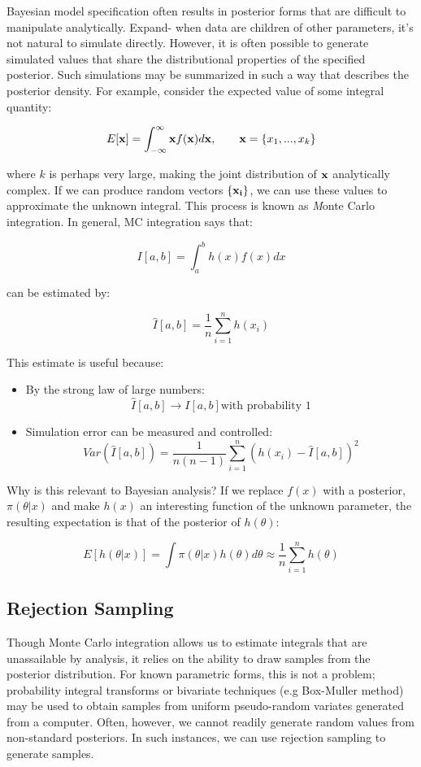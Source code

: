\documentclass[]{book}
\begin{document}
Bayesian model specification often results in posterior forms that are difficult to manipulate analytically. Expand- when data are children of other parameters, it's not natural to simulate directly. However, it is often possible to generate simulated values that share the distributional properties of the specified posterior. Such simulations may be summarized in such a way that describes the posterior density. For example, consider the expected value of some integral quantity:

\[
E[{\bf x}] = \int_{-\infty}^{\infty} {\bf x} f({\bf x}) d{\bf x}, \qquad
{\bf x} = \{x_1,...,x_k\}
\]

\noindent where $k$ is perhaps very large, making the joint distribution of ${\bf x}$ analytically complex. If we can produce random vectors $\{{\bf x_i}\}$, we can use these values to approximate the unknown integral. This process is known as {\emph Monte Carlo integration}. In general, MC integration says that:

\[
I[a,b] = \int_a^b h(x) f(x) dx
\]

\noindent can be estimated by:

\[
\hat{I}[a,b] = \frac{1}{n}\sum_{i=1}^n h(x_i)
\]

\noindent This estimate is useful because:

\begin{itemize}
\item
By the strong law of large numbers:
\[\hat{I}[a,b] \rightarrow I[a,b] \mbox{with probability 1}\]
\item
Simulation error can be measured and controlled:
\[Var(\hat{I}[a,b]) = \frac{1}{n(n-1)}\sum_{i=1}^n (h(x_i)-\hat{I}[a,b])^2\]
\end{itemize}

Why is this relevant to Bayesian analysis? If we replace $f(x)$ with a posterior, $\pi(\theta|x)$ and make $h(x)$ an interesting function of the unknown parameter, the resulting expectation is that of the posterior of $h(\theta)$:

\[
E[h(\theta|x)] = \int \pi(\theta|x) h(\theta) d\theta \approx \frac{1}{n}\sum_{i=1}^n h(\theta)
\]

\subsection{Rejection Sampling}

Though Monte Carlo integration allows us to estimate integrals that are unassailable by analysis, it relies on the ability to draw samples from the posterior distribution. For known parametric forms, this is not a problem; probability integral transforms or bivariate techniques (e.g Box-Muller method) may be used to obtain samples from uniform pseudo-random variates generated from a computer. Often, however, we cannot readily generate random values from non-standard posteriors. In such instances, we can use rejection sampling to generate samples.
\end{document}
